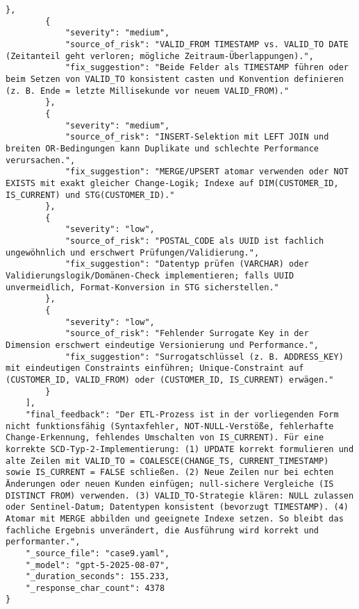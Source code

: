 \begin{lstlisting}[caption={Ausgabe: GPT-5 Anwendungsfall 9 Robustheitsdurchlauf},label={gpt_case9_prompt3}]
        },
        {
            "severity": "medium",
            "source_of_risk": "VALID_FROM TIMESTAMP vs. VALID_TO DATE (Zeitanteil geht verloren; mögliche Zeitraum-Überlappungen).",
            "fix_suggestion": "Beide Felder als TIMESTAMP führen oder beim Setzen von VALID_TO konsistent casten und Konvention definieren (z. B. Ende = letzte Millisekunde vor neuem VALID_FROM)."
        },
        {
            "severity": "medium",
            "source_of_risk": "INSERT-Selektion mit LEFT JOIN und breiten OR-Bedingungen kann Duplikate und schlechte Performance verursachen.",
            "fix_suggestion": "MERGE/UPSERT atomar verwenden oder NOT EXISTS mit exakt gleicher Change-Logik; Indexe auf DIM(CUSTOMER_ID, IS_CURRENT) und STG(CUSTOMER_ID)."
        },
        {
            "severity": "low",
            "source_of_risk": "POSTAL_CODE als UUID ist fachlich ungewöhnlich und erschwert Prüfungen/Validierung.",
            "fix_suggestion": "Datentyp prüfen (VARCHAR) oder Validierungslogik/Domänen-Check implementieren; falls UUID unvermeidlich, Format-Konversion in STG sicherstellen."
        },
        {
            "severity": "low",
            "source_of_risk": "Fehlender Surrogate Key in der Dimension erschwert eindeutige Versionierung und Performance.",
            "fix_suggestion": "Surrogatschlüssel (z. B. ADDRESS_KEY) mit eindeutigen Constraints einführen; Unique-Constraint auf (CUSTOMER_ID, VALID_FROM) oder (CUSTOMER_ID, IS_CURRENT) erwägen."
        }
    ],
    "final_feedback": "Der ETL-Prozess ist in der vorliegenden Form nicht funktionsfähig (Syntaxfehler, NOT-NULL-Verstöße, fehlerhafte Change-Erkennung, fehlendes Umschalten von IS_CURRENT). Für eine korrekte SCD-Typ-2-Implementierung: (1) UPDATE korrekt formulieren und alte Zeilen mit VALID_TO = COALESCE(CHANGE_TS, CURRENT_TIMESTAMP) sowie IS_CURRENT = FALSE schließen. (2) Neue Zeilen nur bei echten Änderungen oder neuen Kunden einfügen; null-sichere Vergleiche (IS DISTINCT FROM) verwenden. (3) VALID_TO-Strategie klären: NULL zulassen oder Sentinel-Datum; Datentypen konsistent (bevorzugt TIMESTAMP). (4) Atomar mit MERGE abbilden und geeignete Indexe setzen. So bleibt das fachliche Ergebnis unverändert, die Ausführung wird korrekt und performanter.",
    "_source_file": "case9.yaml",
    "_model": "gpt-5-2025-08-07",
    "_duration_seconds": 155.233,
    "_response_char_count": 4378
}
\end{lstlisting}

